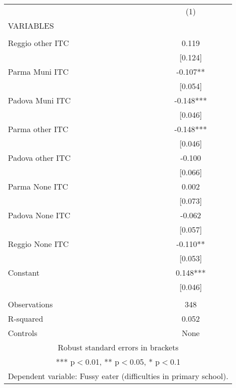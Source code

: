 \begin{tabular}{lc} \hline
 & (1) \\
VARIABLES &  \\ \hline
 &  \\
Reggio other ITC & 0.119 \\
 & [0.124] \\
Parma Muni ITC & -0.107** \\
 & [0.054] \\
Padova Muni ITC & -0.148*** \\
 & [0.046] \\
Parma other ITC & -0.148*** \\
 & [0.046] \\
Padova other ITC & -0.100 \\
 & [0.066] \\
Parma None ITC & 0.002 \\
 & [0.073] \\
Padova None ITC & -0.062 \\
 & [0.057] \\
Reggio None ITC & -0.110** \\
 & [0.053] \\
Constant & 0.148*** \\
 & [0.046] \\
 &  \\
Observations & 348 \\
R-squared & 0.052 \\
 Controls & None \\ \hline
\multicolumn{2}{c}{ Robust standard errors in brackets} \\
\multicolumn{2}{c}{ *** p$<$0.01, ** p$<$0.05, * p$<$0.1} \\
\multicolumn{2}{c}{ Dependent variable: Fussy eater (difficulties in primary school).} \\
\end{tabular}
